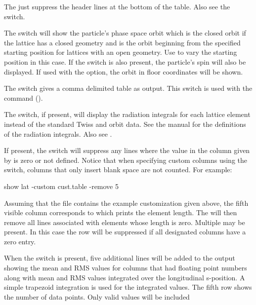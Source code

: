 {{{{{{{{\begin{description}
The  just suppress the header lines at the bottom of the table. Also see the
 switch.
%
\item[-orbit] \Newline
The  switch will show the particle's phase space orbit which is the closed orbit if the
lattice has a closed geometry and is the orbit beginning from the specified starting position for
lattices with an open geometry. Use  to vary the starting position in this
case. If the  switch is also present, the particle's spin will also be displayed. If used
with the  option, the orbit in floor coordinates will be shown.
%
\item[-python] \Newline
The  switch gives a comma delimited table as output. This switch is used with the
 command ().
%
\item[-radiation_integrals] \Newline
The  switch, if present, will display the radiation integrals for each
lattice element instead of the standard Twiss and orbit data. See the \bmad manual for the
definitions of the radiation integrals. Also see .
%
\item[-remove_line_if_zero <column \#>] \Newline
If present, the  switch will suppress any lines where the value
in the column given by  is zero or not defined. Notice that when specifying custom
columns using the  switch, columns that only insert blank space are not counted. For
example:
\begin{example}
  show lat -custom cust.table -remove 5
\end{example}
Assuming that the file  contains the example customization given above, the fifth
visible column corresponds to  which prints the element length. The 
will then remove all lines associated with elements whose length is zero. Multiple
 may be present. In this case the row will be suppressed if all designated
columns have a zero entry.
%
\item[-rms] \Newline
When the  switch is present, five additional lines will be added to the output showing the
mean and RMS values for columns that had floating point numbers along with mean and RMS values
integrated over the longitudinal s-position. A simple trapezoid integration is used for the
integrated values. The fifth row shows the number of data points. Only valid values will be included

\end{description}}}}}}}}}
